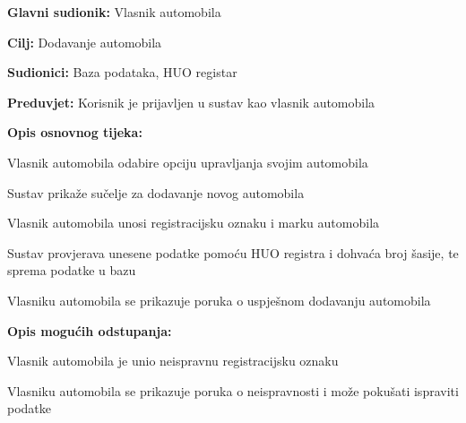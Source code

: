 \noindent {}
\begin{packed_item}
	
	\item \textbf{Glavni sudionik: } Vlasnik automobila
	\item  \textbf{Cilj:} Dodavanje automobila
	\item  \textbf{Sudionici:} Baza podataka, HUO registar
	\item  \textbf{Preduvjet:} Korisnik je prijavljen u sustav kao vlasnik automobila
	\item  \textbf{Opis osnovnog tijeka:}
	
	\item[] \begin{packed_enum}
		
		\item Vlasnik automobila odabire opciju upravljanja svojim automobila
		\item Sustav prikaže sučelje za dodavanje novog automobila
		\item Vlasnik automobila unosi registracijsku oznaku i marku automobila
		\item Sustav provjerava unesene podatke pomoću HUO registra i dohvaća broj šasije, te sprema podatke u bazu
		\item Vlasniku automobila se prikazuje poruka o uspješnom dodavanju automobila
		
	\end{packed_enum}
	
	\item  \textbf{Opis mogućih odstupanja:}
	
	\item[] \begin{packed_item}
		
		\item[4.a] Vlasnik automobila je unio neispravnu registracijsku oznaku
		\item[] \begin{packed_enum}
			
			\item Vlasniku automobila se prikazuje poruka o neispravnosti i može
			pokušati ispraviti podatke
			
		\end{packed_enum}
		
	\end{packed_item}
\end{packed_item}

